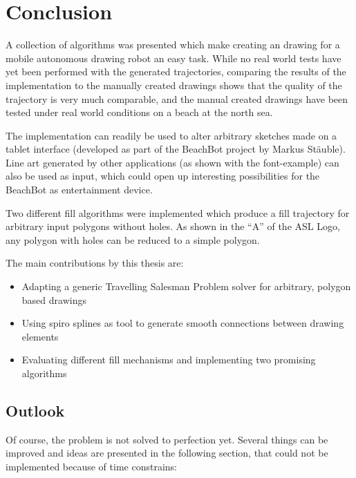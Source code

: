 \chapter{Conclusion}

A collection of algorithms was presented which make creating an drawing for a mobile autonomous drawing robot an easy task. While no real world tests have yet been performed with the generated trajectories, comparing the results of the implementation to the manually created drawings shows that the quality of the trajectory is very much comparable, and the manual created drawings have been tested under real world conditions on a beach at the north sea.

The implementation can readily be used to alter arbitrary sketches made on a tablet interface (developed as part of the BeachBot project by Markus Stäuble). Line art generated by other applications (as shown with the font-example) can also be used as input, which could open up interesting possibilities for the BeachBot as entertainment device.

Two different fill algorithms were implemented which produce a fill trajectory for arbitrary input polygons without holes. As shown in the \enquote{A} of the ASL Logo, any polygon with holes can be reduced to a simple polygon. 


The main contributions by this thesis are: 

\begin{itemize}

\item Adapting a generic Travelling Salesman Problem solver for arbitrary, polygon based drawings
\item Using spiro splines as tool to generate smooth connections between drawing elements
\item Evaluating different fill mechanisms and implementing two promising algorithms
\end{itemize}


\section{Outlook}\label{sec:outlook}
Of course, the problem is not solved to perfection yet. Several things can be improved and ideas are presented in the following section, that could not be implemented because of time constrains:

